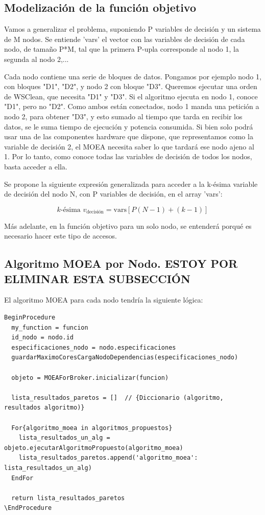 \documentclass{article}
\begin{document}
\subsection{Modelización de la función objetivo}

Vamos a generalizar el problema, suponiendo P variables de decisión y un sistema de M nodos. Se entiende 'vars' el vector con las variables de decisión de cada nodo, de tamaño P*M, tal que la primera P-upla corresponde al nodo 1, la segunda al nodo 2,...

Cada nodo contiene una serie de bloques de datos. Pongamos por ejemplo nodo 1, con bloques "D1", "D2", y nodo 2 con bloque "D3". Queremos ejecutar una orden de WSClean, que necesita "D1" y "D3". Si el algoritmo ejecuta en nodo 1, conoce "D1", pero no "D2". Como ambos están conectados, nodo 1 manda una petición a nodo 2, para obtener "D3", y esto sumado al tiempo que tarda en recibir los datos, se le suma tiempo de ejecución y potencia consumida. Si bien solo podrá usar una de las componentes hardware que dispone, que representamos como la variable de decisión 2, el MOEA necesita saber lo que tardará ese nodo ajeno al 1. Por lo tanto, como conoce todas las variables de decisión de todos los nodos, basta acceder a ella.

Se propone la siguiente expresión generalizada para acceder a la k-ésima variable de decisión del nodo N, con P variables de decisión, en el array 'vars':

\[
	k\text{-ésima } v_{\text{decisión}} = \text{vars}[P(N-1) + (k-1)]
\]

Más adelante, en la función objetivo para un solo nodo, se entenderá porqué es necesario hacer este tipo de accesos.


\subsection{Algoritmo MOEA por Nodo. ESTOY POR ELIMINAR ESTA SUBSECCIÓN}

El algoritmo MOEA para cada nodo tendría la siguiente lógica:

\begin{verbatim}
BeginProcedure
  my_function = funcion
  id_nodo = nodo.id
  especificaciones_nodo = nodo.especificaciones
  guardarMaximoCoresCargaNodoDependencias(especificaciones_nodo)
  
  objeto = MOEAForBroker.inicializar(funcion)
  
  lista_resultados_paretos = []  // {Diccionario (algoritmo, resultados algoritmo)}
  
  For{algoritmo_moea in algoritmos_propuestos}
    lista_resultados_un_alg =  objeto.ejecutarAlgoritmoPropuesto(algoritmo_moea)
    lista_resultados_paretos.append('algoritmo_moea': lista_resultados_un_alg)
  EndFor
  
  return lista_resultados_paretos
\EndProcedure
\end{verbatim}
\end{document}

